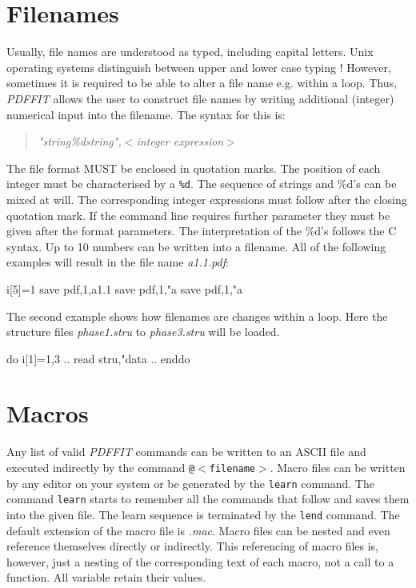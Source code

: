 \section{Filenames \label{fnames}}

Usually, file names are understood as typed, including capital
letters. Unix operating systems distinguish between upper and lower
case typing ! However, sometimes it is required to be able to alter
a file name e.g. within a loop.  Thus, {\it PDFFIT} allows the user
to construct file names by writing additional (integer) numerical
input into the filename.  The syntax for this is:

\begin{quote}
  {\it "string\%dstring",$<$integer expression$>$}
\end{quote}

The file format MUST be enclosed in quotation marks.  The position
of each integer must be characterised by a {\tt \%d}.  The sequence
of strings and \%d's can be mixed at will.  The corresponding
integer expressions must follow after the closing quotation mark. If
the command line requires further parameter they must be given after
the format parameters. The interpretation of the \%d's follows the C
syntax.  Up to 10 numbers can be written into a filename.  All of
the following examples will result in the file name {\it a1.1.pdf}:

\begin{MacVerbatim}
     i[5]=1
     save pdf,1,a1.1
     save pdf,1,"a%
     save pdf,1,"a%
\end{MacVerbatim}

The second example shows how filenames are changes within a loop.
Here the structure files {\it phase1.stru} to {\it phase3.stru} will
be loaded.

\begin{MacVerbatim}
     do i[1]=1,3
       ..
       read stru,"data%
       ..
     enddo
\end{MacVerbatim}


\section{Macros \label{mac}}

Any list of valid {\it PDFFIT} commands can be written to an ASCII
file and executed indirectly by the command {\tt @$<$filename$>$}.
Macro files can be written by any editor on your system or be
generated by the {\tt learn} command. The command {\tt learn} starts
to remember all the commands that follow and saves them into the
given file. The learn sequence is terminated by the {\tt lend}
command.  The default extension of the macro file is {\it .mac}.
Macro files can be nested and even reference themselves directly or
indirectly.  This referencing of macro files is, however, just a
nesting of the corresponding text of each macro, not a call to a
function.  All variable retain their values. \par

